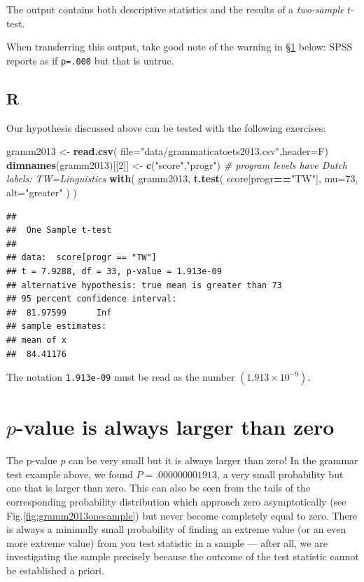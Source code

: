 \documentclass[
]{book}
\newenvironment{Shaded}{\begin{snugshade}}{\end{snugshade}}
\newcommand{\CommentTok}[1]{\textcolor[rgb]{0.56,0.35,0.01}{\textit{#1}}}
\newcommand{\DataTypeTok}[1]{\textcolor[rgb]{0.13,0.29,0.53}{#1}}
\newcommand{\DecValTok}[1]{\textcolor[rgb]{0.00,0.00,0.81}{#1}}
\newcommand{\KeywordTok}[1]{\textcolor[rgb]{0.13,0.29,0.53}{\textbf{#1}}}
\newcommand{\NormalTok}[1]{#1}
\newcommand{\OperatorTok}[1]{\textcolor[rgb]{0.81,0.36,0.00}{\textbf{#1}}}
\newcommand{\StringTok}[1]{\textcolor[rgb]{0.31,0.60,0.02}{#1}}
\begin{document}
The output contains both descriptive statistics and the results
of a \emph{two-sample} \(t\)-test.

When transferring this output, take good note of the warning in
§\ref{sec:plargerthannull} below: SPSS reports as if \texttt{p=.000} but that is untrue.

\hypertarget{r-11}{%
\subsection{R}\label{r-11}}

Our hypothesis discussed above can be tested with the following exercises:

\begin{Shaded}
\begin{Highlighting}[]
\NormalTok{gramm2013 \textless{}{-}}\StringTok{ }\KeywordTok{read.csv}\NormalTok{( }\DataTypeTok{file=}\StringTok{"data/grammaticatoets2013.csv"}\NormalTok{,}\DataTypeTok{header=}\NormalTok{F)}
\KeywordTok{dimnames}\NormalTok{(gramm2013)[[}\DecValTok{2}\NormalTok{]] \textless{}{-}}\StringTok{ }\KeywordTok{c}\NormalTok{(}\StringTok{"score"}\NormalTok{,}\StringTok{"progr"}\NormalTok{)}
\CommentTok{\# program levels have Dutch labels: TW=Linguistics}
\KeywordTok{with}\NormalTok{( gramm2013,}
      \KeywordTok{t.test}\NormalTok{( score[progr}\OperatorTok{==}\StringTok{"TW"}\NormalTok{], }\DataTypeTok{mu=}\DecValTok{73}\NormalTok{, }\DataTypeTok{alt=}\StringTok{"greater"}\NormalTok{ ) )}
\end{Highlighting}
\end{Shaded}

\begin{verbatim}
## 
##  One Sample t-test
## 
## data:  score[progr == "TW"]
## t = 7.9288, df = 33, p-value = 1.913e-09
## alternative hypothesis: true mean is greater than 73
## 95 percent confidence interval:
##  81.97599      Inf
## sample estimates:
## mean of x 
##  84.41176
\end{verbatim}

The notation \texttt{1.913e-09} must be read as the number
\((1.913 \times 10^{-9})\).

\hypertarget{sec:plargerthannull}{%
\section{\texorpdfstring{\(p\)-value is always larger than zero}{p-value is always larger than zero}}\label{sec:plargerthannull}}

The p-value \(p\) can be very small but it is always larger than zero!
In the grammar test example above,
we found \(P=.000000001913\), a very small probability but one that is larger
than zero. This can also be seen from the tails of the corresponding
probability distribution which approach zero asymptotically (see
Fig.\ref{fig:gramm2013onesample}) but never become completely equal
to zero. There is always a minimally small probability of finding
an extreme value (or an even more extreme value) from you test statistic
in a sample --- after all, we are investigating the sample precisely
because the outcome of the test statistic cannot be established a priori.
\end{document}
